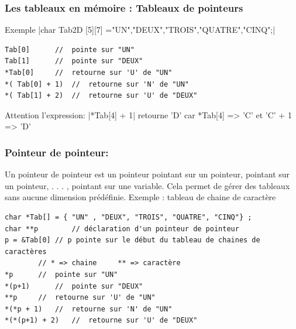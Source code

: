 \documentclass{beamer}
\begin{document}

\begin{frame}[fragile]
\frametitle{Les tableaux en mémoire : Tableaux de pointeurs}
Exemple
|char Tab2D [5][7] ={"UN","DEUX","TROIS","QUATRE","CINQ"};|

\begin{verbatim}
Tab[0]		//  pointe sur "UN"
Tab[1] 		//  pointe sur "DEUX"
*Tab[0]		//  retourne sur 'U' de "UN"
*( Tab[0] + 1) 	//  retourne sur 'N' de "UN"
*( Tab[1] + 2)	//  retourne sur 'U' de "DEUX"
\end{verbatim}
Attention l'expression:
|*Tab[4] + 1|	   
retourne 'D' car *Tab[4] => 'C' et 'C' + 1 => 'D'


\end{frame}


\begin{frame}[fragile]
\frametitle{Pointeur de pointeur:}
Un pointeur de pointeur est un pointeur pointant sur un pointeur, pointant sur un pointeur, . . . , pointant sur une variable. Cela permet de gérer des tableaux sans aucune dimension prédéfinie.
Exemple : tableau de chaine de caractère

\begin{verbatim}
char *Tab[] = { "UN" , "DEUX", "TROIS", "QUATRE", "CINQ"} ;
char **p		// déclaration d'un pointeur de pointeur
p = &Tab[0]	// p pointe sur le début du tableau de chaines de caractères
		// * => chaine     ** => caractère
*p		//  pointe sur "UN" 
*(p+1) 		//  pointe sur "DEUX"
**p		//  retourne sur 'U' de "UN"
*(*p + 1) 	//  retourne sur 'N' de "UN"
*(*(p+1) + 2)	//  retourne sur 'U' de "DEUX"

\end{verbatim}

\end{frame}

\end{document}
